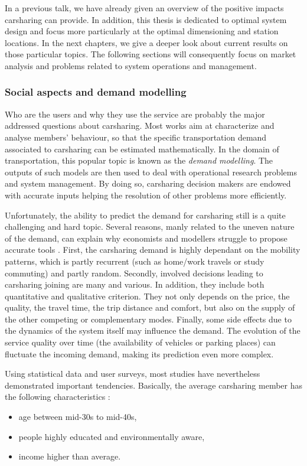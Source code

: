 \medskip
In a previous talk, we have already given an overview of the positive impacts carsharing can provide.
In addition, this thesis is dedicated to optimal system design and focus more particularly at the optimal dimensioning and station locations.
In the next chapters, we give a deeper look about current results on those particular topics.
The following sections will consequently focus on market analysis and problems related to system operations and management.


\subsubsection{Social aspects and demand modelling}
Who are the users and why they use the service are probably the major addressed questions about carsharing.
Most works aim at characterize and analyse members' behaviour, so that the specific transportation demand associated to carsharing can be estimated mathematically.
In the domain of transportation, this popular topic is known as the \emph{demand modelling}.
The outputs of such models are then used to deal with operational research problems and system management.
By doing so, carsharing decision makers are endowed with accurate inputs helping the resolution of other problems more efficiently.

\medskip
Unfortunately, the ability to predict the demand for carsharing still is a quite challenging and hard topic.
Several reasons, manly related to the uneven nature of the demand, can explain why economists and modellers struggle to propose accurate tools \cite{danielis_potential_2015}.
First, the carsharing demand is highly dependant on the mobility patterns, which is partly recurrent (such as home/work travels or study commuting) and partly random.
Secondly, involved decisions leading to carsharing joining are many and various.
In addition, they include both quantitative and qualitative criterion.
They not only depends on the price, the quality, the travel time, the trip distance and comfort, but also on the supply of the other competing or complementary modes.
Finally, some side effects due to the dynamics of the system itself may influence the demand.
The evolution of the service quality over time (\eg the availability of vehicles or parking places) can fluctuate the incoming demand, making its prediction even more complex.

\medskip
Using statistical data and user surveys, most studies have nevertheless demonstrated important tendencies.
Basically, the average carsharing member has the following characteristics
\cite{brook_carsharingstart_2004}
\cite{millard_ball_car_sharing_2005}
\cite{lane_phillycarshare_2005}
\cite{zheng_carsharing_2009}
\cite{costain_synopsis_2012}
\cite{efthymiou_which_2012}:
\begin{itemize}
\item age between mid-30s to mid-40s,
\item people highly educated and environmentally aware,
\item income higher than average.
\end{itemize}


